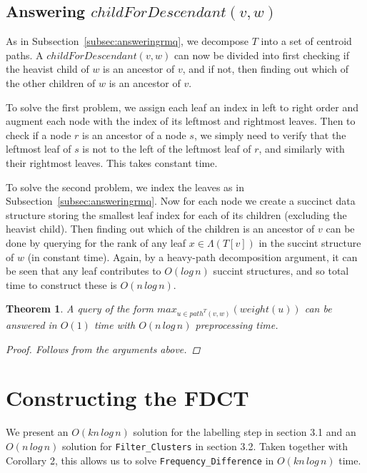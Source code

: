 \documentclass{article}
\newcommand{\leafset}{\Lambda}
\newtheorem{rmqstructure}[incompatibility]{Theorem}
\begin{document}
    \subsection{Answering $childForDescendant(v, w)$}
    \label{subsec:answeringcfd}

    As in Subsection~\ref{subsec:answeringrmq}, we decompose $T$ into a set of centroid paths. A $childForDescendant(v, w)$ can now be divided into first checking if the heavist child of $w$ is an ancestor of $v$, and if not, then finding out which of the other children of $w$ is an ancestor of $v$.

    To solve the first problem, we assign each leaf an index in left to right order and augment each node with the index of its leftmost and rightmost leaves. Then to check if a node $r$ is an ancestor of a node $s$, we simply need to verify that the leftmost leaf of $s$ is not to the left of the leftmost leaf of $r$, and similarly with their rightmost leaves. This takes constant time.

    To solve the second problem, we index the leaves as in Subsection~\ref{subsec:answeringrmq}. Now for each node we create a succinct data structure storing the smallest leaf index for each of its children (excluding the heavist child). Then finding out which of the children is an ancestor of $v$ can be done by querying for the rank of any leaf $x \in \leafset(T[v])$ in the succint structure of $w$ (in constant time). Again, by a heavy-path decomposition argument, it can be seen that any leaf contributes to $O(log\,n)$ succint structures, and so total time to construct these is $O(n\,log\,n)$.
    \newline

    \begin{rmqstructure}
        \label{theorem:rmqstructure}
        A query of the form $max_{u \in path^{T}(v, w)}(weight(u))$ can be answered in $O(1)$ time with $O(n\,log\,n)$ preprocessing time.

        \begin{proof}
            Follows from the arguments above.
        \end{proof}
    \end{rmqstructure}

    \section{Constructing the FDCT}
    \label{sec:freqdiffconstruction}

    We present an $O(kn\,log\,n)$ solution for the labelling step in section 3.1 and an $O(n\,log\,n)$ solution for \texttt{Filter\_Clusters} in section 3.2. Taken together with Corollary 2, this allows us to solve \texttt{Frequency\_Difference} in $O(kn\,log\,n)$ time.
\end{document}
